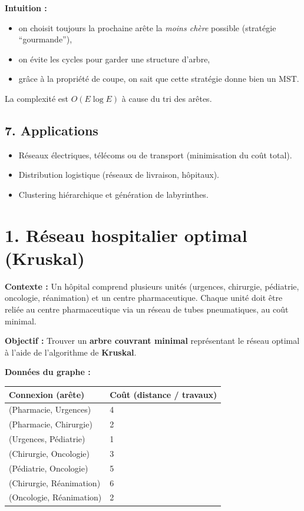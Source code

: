 \textbf{Intuition :} \\
\begin{itemize}
    \item on choisit toujours la prochaine arête la \emph{moins chère} possible (stratégie “gourmande”),
    \item on évite les cycles pour garder une structure d’arbre,
    \item grâce à la propriété de coupe, on sait que cette stratégie donne bien un MST. \\
\end{itemize}

La complexité est \( O(E \log E) \) à cause du tri des arêtes. 

\subsection*{7. Applications}

\begin{itemize}
    \item Réseaux électriques, télécoms ou de transport (minimisation du coût total).
    \item Distribution logistique (réseaux de livraison, hôpitaux).
    \item Clustering hiérarchique et génération de labyrinthes.
\end{itemize}

\newpage

\section*{1. Réseau hospitalier optimal (Kruskal)}

\textbf{Contexte :}  
Un hôpital comprend plusieurs unités (urgences, chirurgie, pédiatrie, oncologie, réanimation) et un centre pharmaceutique.  
Chaque unité doit être reliée au centre pharmaceutique via un réseau de tubes pneumatiques, au coût minimal.

\medskip

\textbf{Objectif :} Trouver un \textbf{arbre couvrant minimal} représentant le réseau optimal à l’aide de l’algorithme de \textbf{Kruskal}.

\medskip

\textbf{Données du graphe :}

\begin{center}
\begin{tabular}{ll}
\toprule
\textbf{Connexion (arête)} & \textbf{Coût (distance / travaux)} \\
\midrule
(Pharmacie, Urgences) & 4 \\
(Pharmacie, Chirurgie) & 2 \\
(Urgences, Pédiatrie) & 1 \\
(Chirurgie, Oncologie) & 3 \\
(Pédiatrie, Oncologie) & 5 \\
(Chirurgie, Réanimation) & 6 \\
(Oncologie, Réanimation) & 2 \\
\bottomrule
\end{tabular}
\end{center}

